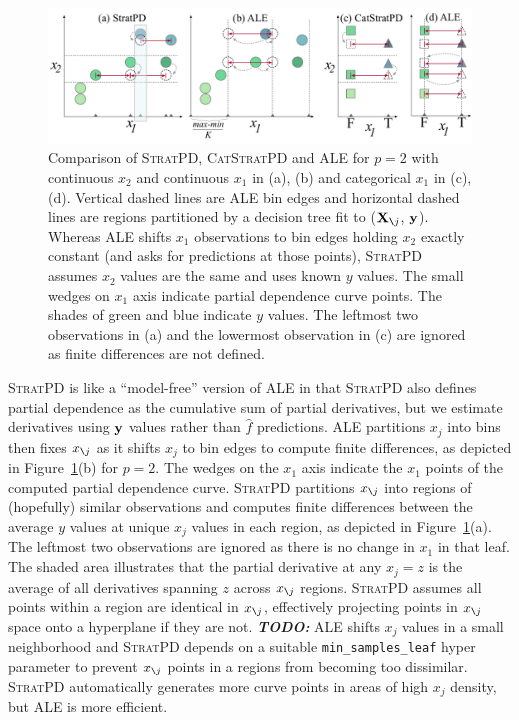 \documentclass[smallextended]{svjour3}       %
\newcommand{\figref}[1]{Figure~\ref{#1}}
\newcommand{\todo}[1]{{\bf\em TODO:} {{\color{red}{#1}}}}
\newcommand{\spd}{\fontfamily{cmr}\textsc{\small StratPD}}
\newcommand{\cspd}{\fontfamily{cmr}\textsc{\small CatStratPD}}
\newcommand{\Xnj}{${\bf X}_{\texttt{\char`\\} j}$}
\newcommand{\xnj}{$x_{\texttt{\char`\\} j}$}
\begin{document}
\begin{figure}[!htbp]
\begin{center}
\includegraphics[scale=.4]{images/partitioning.pdf}\vspace{-3mm}
\caption{\small Comparison of \spd, \cspd{} and ALE for $p=2$ with continuous $x_2$ and continuous $x_1$ in (a), (b) and  categorical $x_1$ in (c), (d).  Vertical dashed lines are ALE bin edges and horizontal dashed lines are regions partitioned by a decision tree fit to (\Xnj, ${\bf y}$). Whereas ALE shifts $x_1$ observations to bin edges holding $x_2$ exactly constant (and asks for predictions at those points), \spd{} assumes $x_2$ values are the same and uses known $y$ values. The small wedges on $x_1$ axis indicate partial dependence curve points.  The shades of green and blue indicate $y$ values. The leftmost two observations in (a) and the lowermost observation in (c) are ignored as finite differences are not defined.}
\label{fig:partitioning}
\end{center}
\end{figure}

\spd{} is like a ``model-free'' version of ALE in that \spd{} also defines partial dependence as the cumulative sum of partial derivatives, but we estimate derivatives using $\bf y$ values rather than $\hat{f}$ predictions. 
ALE partitions $x_j$ into bins then fixes \xnj{} as it shifts $x_j$ to bin edges to compute finite differences, as depicted in \figref{fig:partitioning}(b) for $p=2$. The wedges on the $x_1$ axis indicate the $x_1$ points of the computed partial dependence curve.  \spd{} partitions \xnj{} into regions of (hopefully) similar observations and computes finite differences between the average $y$ values at unique $x_j$ values in each region, as depicted in \figref{fig:partitioning}(a).  The leftmost two observations are ignored as there is no change in $x_1$ in that leaf. The shaded area illustrates that the partial derivative at any $x_j=z$ is the average of all derivatives spanning $z$ across \xnj{} regions.  \spd{} assumes all points within a region are identical in \xnj{}, effectively projecting points in \xnj{} space onto a hyperplane if they are not. \todo{sound right James?}  ALE shifts $x_j$ values in a small neighborhood and \spd{} depends on a suitable {\tt\small min\_samples\_leaf}  hyper parameter to prevent \xnj{} points in a regions from becoming too dissimilar.  \spd{} automatically generates more curve points in areas of high $x_j$ density, but ALE is more efficient.
\end{document}

